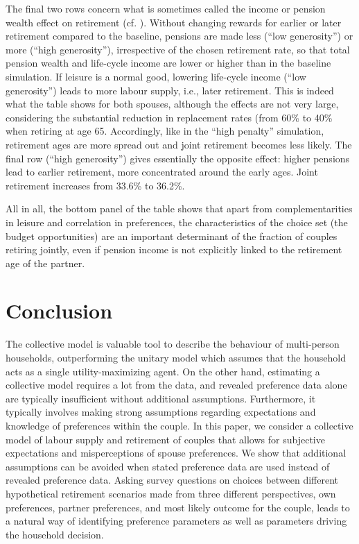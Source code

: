 \documentclass[11pt,letter]{article}
\begin{document}
The final two rows concern what is sometimes called the income or pension wealth effect on retirement (cf. \citet{vsoest2014}). Without changing rewards for earlier or later retirement compared to the baseline, pensions are made less (``low generosity'') or more (``high generosity''), irrespective of the chosen retirement rate, so that total pension wealth and life-cycle income are lower or higher than in the baseline simulation. If leisure is a normal good, lowering life-cycle income (``low generosity'') leads to more labour supply, i.e., later retirement. This is indeed what the table shows for both spouses, although the effects are not very large, considering the substantial reduction in replacement rates (from 60\% to 40\% when retiring at age 65. Accordingly, like in the ``high penalty'' simulation, retirement ages are more spread out and joint retirement becomes less likely. The final row (``high generosity'') gives essentially the opposite effect: higher pensions lead to earlier retirement, more concentrated around the early ages. Joint retirement increases from 33.6\% to 36.2\%.

All in all, the bottom panel of the table shows that apart from complementarities in leisure and correlation in preferences, the characteristics of the choice set (the budget opportunities) are an important determinant of the fraction of couples retiring jointly, even if pension income is not explicitly linked to the retirement age of the partner.

\section{Conclusion}

\par The collective model is valuable tool to describe the behaviour of multi-person households, outperforming the unitary model which assumes that the household acts as a single utility-maximizing agent. On the other hand, estimating a collective model requires a lot from the data, and revealed preference data alone are typically insufficient without additional assumptions. Furthermore, it typically involves making strong assumptions regarding expectations and knowledge of preferences within the couple. In this paper, we consider a collective model of labour supply and retirement of couples that allows for subjective expectations and misperceptions of spouse preferences. We show that additional assumptions can be avoided when stated preference data are used instead of revealed preference data. Asking survey questions on choices between different hypothetical retirement scenarios made from three different perspectives, own preferences, partner preferences, and most likely outcome for the couple, leads to a natural way of identifying preference parameters as well as parameters driving the household decision.
\end{document}
